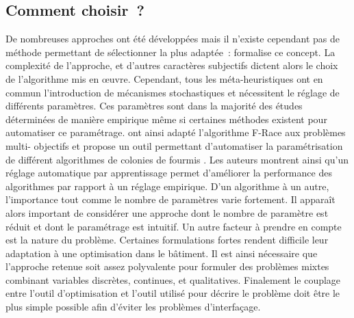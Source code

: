 \subsection{Comment choisir~?} %
\label{sub:comment_choisir}
De nombreuses approches ont été développées mais il n’existe cependant pas de
méthode permettant de sélectionner la plus adaptée~: \cite{Wolpert199767}
formalise ce concept. La complexité de l’approche, et d’autres caractères
subjectifs dictent alors le choix de l’algorithme mis en œuvre. Cependant, tous
les méta-heuristiques ont en commun l’introduction de mécanismes stochastiques
et nécessitent le réglage de différents paramètres. Ces paramètres sont dans la
majorité des études déterminées de manière empirique même si certaines méthodes
existent pour automatiser ce paramétrage. \cite{Lopez-Ibanez2012861} ont ainsi
adapté l’algorithme F-Race \parencite{Birattari2010311} aux problèmes multi-
objectifs et propose un outil permettant d’automatiser la paramétrisation de
différent algorithmes de colonies de fourmis \parencite{Lopez-Ibanez2012861}.
Les auteurs montrent ainsi qu’un réglage automatique par apprentissage permet
d’améliorer la performance des algorithmes par rapport à un réglage empirique.
D’un algorithme à un autre, l’importance tout comme le nombre de paramètres
varie fortement. Il apparaît alors important de considérer une approche dont le
nombre de paramètre est réduit et dont le paramétrage est intuitif. Un autre
facteur à prendre en compte est la nature du problème. Certaines formulations
fortes rendent difficile leur adaptation à une optimisation dans le bâtiment. Il
est ainsi nécessaire que l’approche retenue soit assez polyvalente pour formuler des
problèmes mixtes combinant variables discrètes, continues, et qualitatives.
Finalement le couplage entre l’outil d’optimisation et l’outil utilisé pour
décrire le problème doit être le plus simple possible afin d’éviter les
problèmes d’interfaçage.

